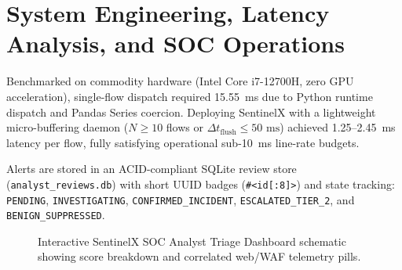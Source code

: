 \documentclass[conference]{IEEEtran}
\begin{document}
\section{System Engineering, Latency Analysis, and SOC Operations}
Benchmarked on commodity hardware (Intel Core i7-12700H, zero GPU acceleration), single-flow dispatch required 15.55~ms due to Python runtime dispatch and Pandas Series coercion. Deploying SentinelX with a lightweight micro-buffering daemon ($N \ge 10$ flows or $\Delta t_{\text{flush}} \le 50\text{ ms}$) achieved 1.25--2.45~ms latency per flow, fully satisfying operational sub-10~ms line-rate budgets.

Alerts are stored in an ACID-compliant SQLite review store (\texttt{analyst\_reviews.db}) with short UUID badges (\texttt{\#<id[:8]>}) and state tracking: \texttt{PENDING}, \texttt{INVESTIGATING}, \texttt{CONFIRMED\_INCIDENT}, \texttt{ESCALATED\_TIER\_2}, and \texttt{BENIGN\_SUPPRESSED}.

\begin{figure}[!t]
\centering
{}
\caption{Interactive SentinelX SOC Analyst Triage Dashboard schematic showing score breakdown and correlated web/WAF telemetry pills.}
\label{fig:soc_dashboard}
\end{figure}
\end{document}
